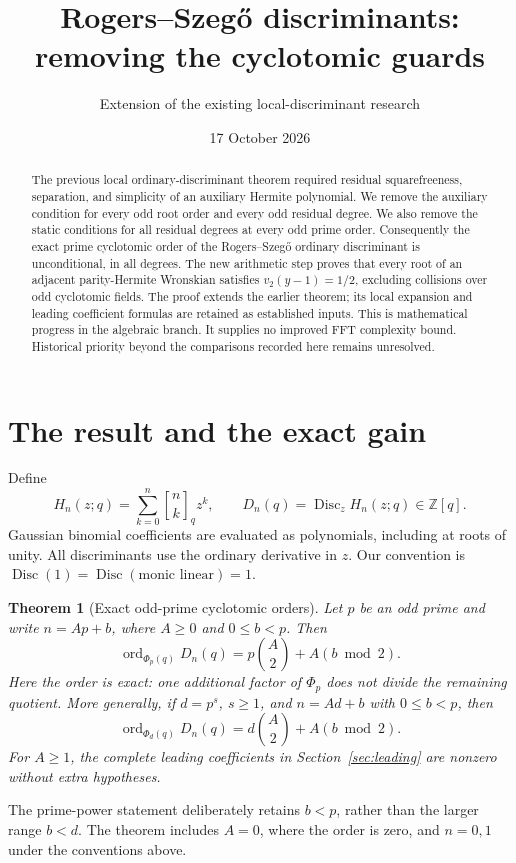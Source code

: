 \documentclass[11pt]{article}
\title{\color{ink}Rogers--Szeg\H{o} discriminants:\\
removing the cyclotomic guards}
\author{Extension of the existing local-discriminant research}
\date{17 October 2026}
\newtheorem{theorem}{Theorem}
\theoremstyle{remark}\newtheorem{remark}[theorem]{Remark}
\newcommand{\Disc}{\operatorname{Disc}}
\newcommand{\ord}{\operatorname{ord}}
\newcommand{\Z}{\mathbb{Z}}
\begin{document}
\maketitle
\begin{abstract}
The previous local ordinary-discriminant theorem required residual
squarefreeness, separation, and simplicity of an auxiliary Hermite
polynomial. We remove the auxiliary condition for every odd root order
and every odd residual degree. We also remove the static conditions for
all residual degrees at every odd prime order. Consequently the exact
prime cyclotomic order of the Rogers--Szeg\H{o} ordinary discriminant is
unconditional, in all degrees. The new arithmetic step proves that every
root of an adjacent parity-Hermite Wronskian satisfies
$v_2(y-1)=1/2$, excluding collisions over odd cyclotomic fields.
The proof extends the earlier theorem; its local expansion and leading
coefficient formulas are retained as established inputs.
This is mathematical progress in the algebraic branch. It supplies no
improved FFT complexity bound. Historical priority beyond the comparisons
recorded here remains unresolved.
\end{abstract}

\section{The result and the exact gain}

Define
\[
H_n(z;q)=\sum_{k=0}^n \genfrac{[}{]}{0pt}{}{n}{k}_q z^k,\qquad
D_n(q)=\Disc_z H_n(z;q)\in\Z[q].
\]
Gaussian binomial coefficients are evaluated as polynomials, including
at roots of unity. All discriminants use the ordinary derivative in
$z$. Our convention is $\Disc(1)=\Disc(\text{monic linear})=1$.

\begin{theorem}[Exact odd-prime cyclotomic orders]\label{thm:main}
Let $p$ be an odd prime and write $n=Ap+b$, where $A\geq0$ and
$0\leq b<p$. Then
\[
\boxed{\ord_{\Phi_p(q)}D_n(q)
       =p\binom{A}{2}+A(b\bmod2).}
\tag{1}
\]
Here the order is exact: one additional factor of $\Phi_p$ does not
divide the remaining quotient. More generally, if $d=p^s$, $s\geq1$,
and $n=Ad+b$ with $0\leq b<p$, then
\[
\boxed{\ord_{\Phi_d(q)}D_n(q)
       =d\binom{A}{2}+A(b\bmod2).}
\tag{2}
\]
For $A\geq1$, the complete leading coefficients in
Section~\ref{sec:leading} are nonzero without extra hypotheses.
\end{theorem}

The prime-power statement deliberately retains $b<p$, rather than the
larger range $b<d$. The theorem includes $A=0$, where the order is zero,
and $n=0,1$ under the conventions above.
\end{document}
